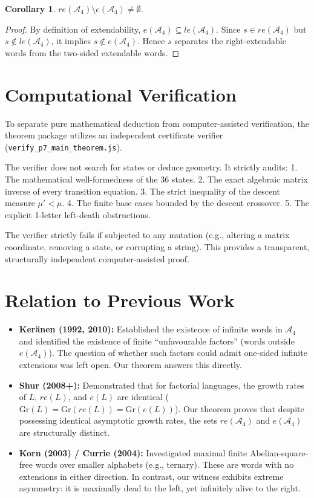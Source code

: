 \documentclass[12pt]{article}
\newtheorem{corollary}{Corollary}
\begin{document}
\begin{corollary}
$re(\mathcal{A}_4) \setminus e(\mathcal{A}_4) \neq \emptyset$.
\end{corollary}
\begin{proof}
By definition of extendability, $e(\mathcal{A}_4) \subseteq le(\mathcal{A}_4)$. Since $s \in re(\mathcal{A}_4)$ but $s \notin le(\mathcal{A}_4)$, it implies $s \notin e(\mathcal{A}_4)$. Hence $s$ separates the right-extendable words from the two-sided extendable words.
\end{proof}


\section{Computational Verification}
To separate pure mathematical deduction from computer-assisted verification, the theorem package utilizes an independent certificate verifier (\texttt{verify\_p7\_main\_theorem.js}). 

The verifier does not search for states or deduce geometry. It strictly audits:
1. The mathematical well-formedness of the 36 states.
2. The exact algebraic matrix inverse of every transition equation.
3. The strict inequality of the descent measure $\mu' < \mu$.
4. The finite base cases bounded by the descent crossover.
5. The explicit 1-letter left-death obstructions.

The verifier strictly fails if subjected to any mutation (e.g., altering a matrix coordinate, removing a state, or corrupting a string). This provides a transparent, structurally independent computer-assisted proof.


\section{Relation to Previous Work}
\begin{itemize}
    \item \textbf{Ker\"anen (1992, 2010):} Established the existence of infinite words in $\mathcal{A}_4$ and identified the existence of finite ``unfavourable factors'' (words outside $e(\mathcal{A}_4)$). The question of whether such factors could admit one-sided infinite extensions was left open. Our theorem answers this directly.
    \item \textbf{Shur (2008+):} Demonstrated that for factorial languages, the growth rates of $L$, $re(L)$, and $e(L)$ are identical ($\text{Gr}(L) = \text{Gr}(re(L)) = \text{Gr}(e(L))$). Our theorem proves that despite possessing identical asymptotic growth rates, the sets $re(\mathcal{A}_4)$ and $e(\mathcal{A}_4)$ are structurally distinct.
    \item \textbf{Korn (2003) / Currie (2004):} Investigated maximal finite Abelian-square-free words over smaller alphabets (e.g., ternary). These are words with no extensions in either direction. In contrast, our witness exhibits extreme asymmetry: it is maximally dead to the left, yet infinitely alive to the right.
\end{itemize}
\end{document}
